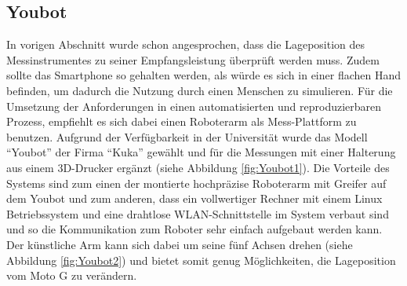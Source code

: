 \subsection{Youbot}\label{sec:You}
In vorigen Abschnitt wurde schon angesprochen, dass die Lageposition des Messinstrumentes zu seiner Empfangsleistung überprüft werden muss. Zudem sollte das Smartphone so gehalten werden, als würde es sich in einer flachen Hand befinden, um dadurch die Nutzung durch einen Menschen zu simulieren. Für die Umsetzung der Anforderungen in einen automatisierten und reproduzierbaren Prozess, empfiehlt es sich dabei einen Roboterarm als Mess-Plattform zu benutzen. Aufgrund der Verfügbarkeit in der Universität wurde das Modell "`Youbot"' der Firma "`Kuka"' gewählt und für die Messungen mit einer Halterung aus einem 3D-Drucker ergänzt (siehe Abbildung \ref{fig:Youbot1}). Die Vorteile des Systems sind zum einen der montierte hochpräzise Roboterarm mit Greifer auf dem Youbot und zum anderen, dass ein vollwertiger Rechner mit einem Linux Betriebssystem und eine drahtlose WLAN-Schnittstelle im System verbaut sind und so die Kommunikation zum Roboter sehr einfach aufgebaut werden kann. Der künstliche Arm kann sich dabei um seine fünf Achsen drehen (siehe Abbildung \ref{fig:Youbot2}) und bietet somit genug Möglichkeiten, die Lageposition vom Moto G zu verändern. 
